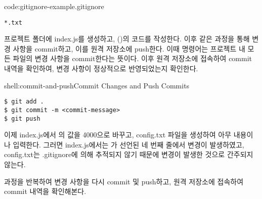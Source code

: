 \begin{codeenv}{code:gitignore-example}{.gitignore}\begin{verbatim}
*.txt
\end{verbatim}
\end{codeenv}

프로젝트 폴더에 index.js를 생성하고, (\pageref{code:nodejs-simple-web-server})의 코드를 작성한다. 이후 \와 같은 과정을 통해 변경 사항을 commit하고, 이를 원격 저장소에 push한다. 이때  명령어는 프로젝트 내 모든 파일의 변경 사항을 commit한다는 뜻이다. 이후 원격 저장소에 접속하여 commit 내역을 확인하여, 변경 사항이 정상적으로 반영되었는지 확인한다.

\begin{shellenv}{shell:commit-and-push}{Commit Changes and Push Commits}\begin{verbatim}
$ git add .
$ git commit -m <commit-message>
$ git push
\end{verbatim}
\end{shellenv}

이제 index.js에서 의 값을 4000으로 바꾸고, config.txt 파일을 생성하여 아무 내용이나 입력한다. 그러면 index.js에서는 가 선언된 네 번째 줄에서 변경이 발생하였고, config.txt는 .gitignore에 의해 추적되지 않기 때문에 변경이 발생한 것으로 간주되지 않는다.

 과정을 반복하여 변경 사항을 다시 commit 및 push하고, 원격 저장소에 접속하여 commit 내역을 확인해본다.
